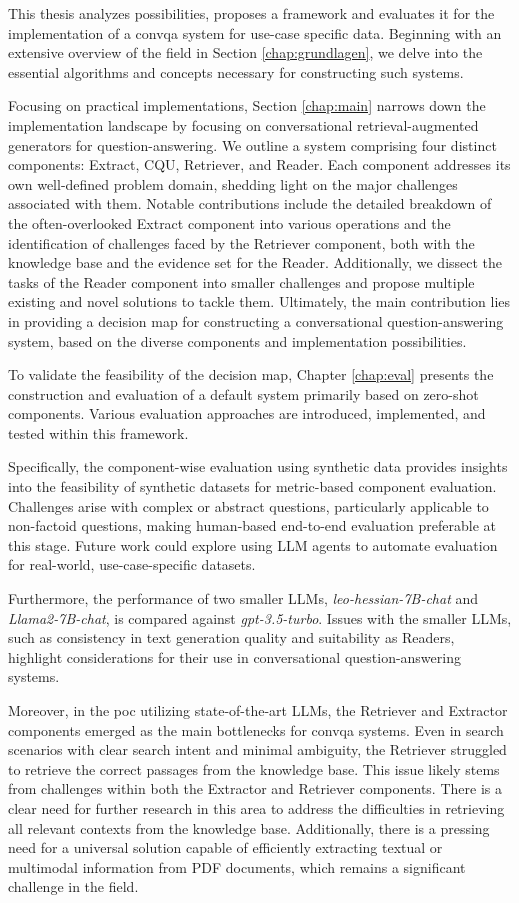 This thesis analyzes possibilities, proposes a framework and evaluates it for the implementation of a \gls{convqa} system for use-case specific data. Beginning with an extensive overview of the field in Section \ref{chap:grundlagen}, we delve into the essential algorithms and concepts necessary for constructing such systems.

Focusing on practical implementations, Section \ref{chap:main} narrows down the implementation landscape by focusing on conversational retrieval-augmented generators for question-answering. We outline a system comprising four distinct components: Extract, CQU, Retriever, and Reader. Each component addresses its own well-defined problem domain, shedding light on the major challenges associated with them. Notable contributions include the detailed breakdown of the often-overlooked Extract component into various operations and the identification of challenges faced by the Retriever component, both with the knowledge base and the evidence set for the Reader. Additionally, we dissect the tasks of the Reader component into smaller challenges and propose multiple existing and novel solutions to tackle them. Ultimately, the main contribution lies in providing a decision map for constructing a conversational question-answering system, based on the diverse components and implementation possibilities.

To validate the feasibility of the decision map, Chapter \ref{chap:eval} presents the construction and evaluation of a default system primarily based on zero-shot components. Various evaluation approaches are introduced, implemented, and tested within this framework.

Specifically, the component-wise evaluation using synthetic data provides insights into the feasibility of synthetic datasets for metric-based component evaluation. Challenges arise with complex or abstract questions, particularly applicable to non-factoid questions, making human-based end-to-end evaluation preferable at this stage. Future work could explore using LLM agents to automate evaluation for real-world, use-case-specific datasets.

Furthermore, the performance of two smaller LLMs, \textit{leo-hessian-7B-chat} and \textit{Llama2-7B-chat}, is compared against \textit{gpt-3.5-turbo}. Issues with the smaller LLMs, such as consistency in text generation quality and suitability as Readers, highlight considerations for their use in conversational question-answering systems.

Moreover, in the \gls{poc} utilizing state-of-the-art LLMs, the Retriever and Extractor components emerged as the main bottlenecks for \gls{convqa} systems. Even in search scenarios with clear search intent and minimal ambiguity, the Retriever struggled to retrieve the correct passages from the knowledge base. This issue likely stems from challenges within both the Extractor and Retriever components. There is a clear need for further research in this area to address the difficulties in retrieving all relevant contexts from the knowledge base. Additionally, there is a pressing need for a universal solution capable of efficiently extracting textual or multimodal information from PDF documents, which remains a significant challenge in the field.

